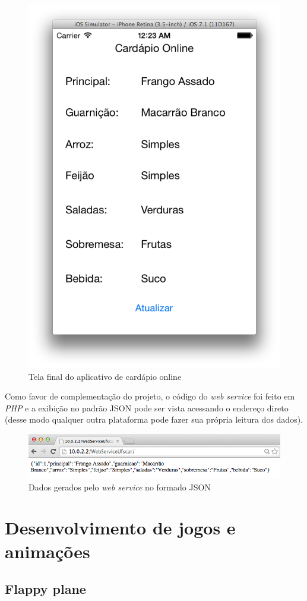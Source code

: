 \documentclass[a4paper,12pt,brazil,doubleside]{book}
\begin{document}
\begin{singlespace}
\begin{figure}[H]
  \centering
  \includegraphics[width=.55\textwidth]{figuras/5/APP_Cardapio2.png}
  \caption{Tela final do aplicativo de cardápio online}
  \label{fig:app_cardapio2}
\end{figure}

Como favor de complementação do projeto, o código do \emph{web service} foi feito em \emph{PHP} e a exibição no padrão JSON pode ser vista acessando o endereço direto (desse modo qualquer outra plataforma pode fazer sua própria leitura dos dados).

\begin{figure}[H]
  \centering
  \includegraphics[width=.75\textwidth]{figuras/5/APP_Cardapio3.png}
  \caption{Dados gerados pelo \emph{web service} no formado JSON}
  \label{fig:a}
\end{figure}


\chapter{Desenvolvimento de jogos e animações}

\section{Flappy plane}


\end{singlespace}
\end{document}
